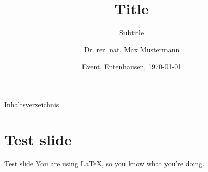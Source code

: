 \documentclass{TIBbeamer}
\title{Title}
\subtitle{Subtitle}
\author{Dr.\:\! rer.\:\! nat.\:\! Max Mustermann}
\date{Event, Entenhausen, \today}
\begin{document}

\begin{frame}
\thispagestyle{empty}
\titlepage
\end{frame}


\begin{frame}{Inhaltsverzeichnis}
\tableofcontents
\end{frame}


\section{Test slide}
\begin{frame}{Test slide}
You are using \LaTeX, so you know what you're doing.
\end{frame}

\end{document}
